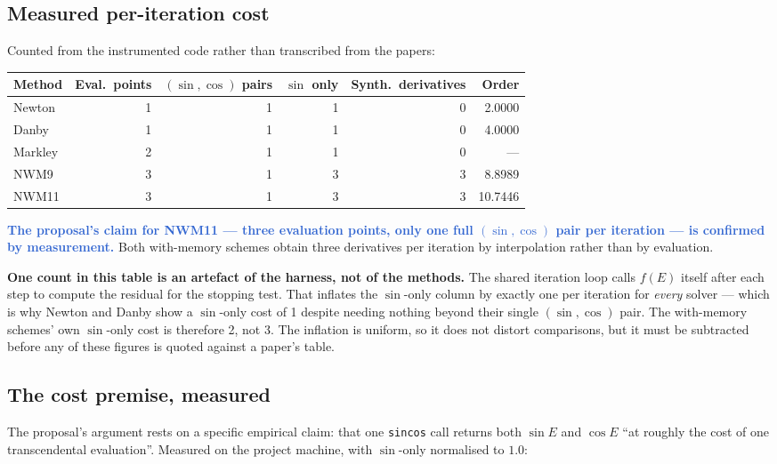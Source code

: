 \documentclass[11pt,a4paper]{article}
\newcommand{\key}[1]{\textcolor{Highlight}{\bfseries #1}}
\begin{document}
\subsection{Measured per-iteration cost}

Counted from the instrumented code rather than transcribed from the
papers:

\begin{center}
\small
\begin{tabular}{@{}lrrrrr@{}}
\toprule
\textbf{Method} & \textbf{Eval.\ points} & \textbf{$(\sin,\cos)$ pairs} & \textbf{$\sin$ only} & \textbf{Synth.\ derivatives} & \textbf{Order} \\
\midrule
Newton  & 1 & 1 & 1 & 0 & 2.0000 \\
Danby   & 1 & 1 & 1 & 0 & 4.0000 \\
Markley & 2 & 1 & 1 & 0 & --- \\
NWM9    & 3 & 1 & 3 & 3 & 8.8989 \\
NWM11   & 3 & 1 & 3 & 3 & 10.7446 \\
\bottomrule
\end{tabular}
\end{center}

\key{The proposal's claim for NWM11 --- three evaluation points, only one
full $(\sin,\cos)$ pair per iteration --- is confirmed by measurement.}
Both with-memory schemes obtain three derivatives per iteration by
interpolation rather than by evaluation.

\begin{note}
\textbf{One count in this table is an artefact of the harness, not of the
methods.} The shared iteration loop calls $f(E)$ itself after each step to
compute the residual for the stopping test. That inflates the
$\sin$-only column by exactly one per iteration for \emph{every} solver
--- which is why Newton and Danby show a $\sin$-only cost of 1 despite
needing nothing beyond their single $(\sin,\cos)$ pair. The with-memory
schemes' own $\sin$-only cost is therefore 2, not 3. The inflation is
uniform, so it does not distort comparisons, but it must be subtracted
before any of these figures is quoted against a paper's table.
\end{note}

\subsection{The cost premise, measured}

The proposal's argument rests on a specific empirical claim: that one
\texttt{sincos} call returns both $\sin E$ and $\cos E$ ``at roughly the
cost of one transcendental evaluation''. Measured on the project machine,
with $\sin$-only normalised to $1.0$:
\end{document}
